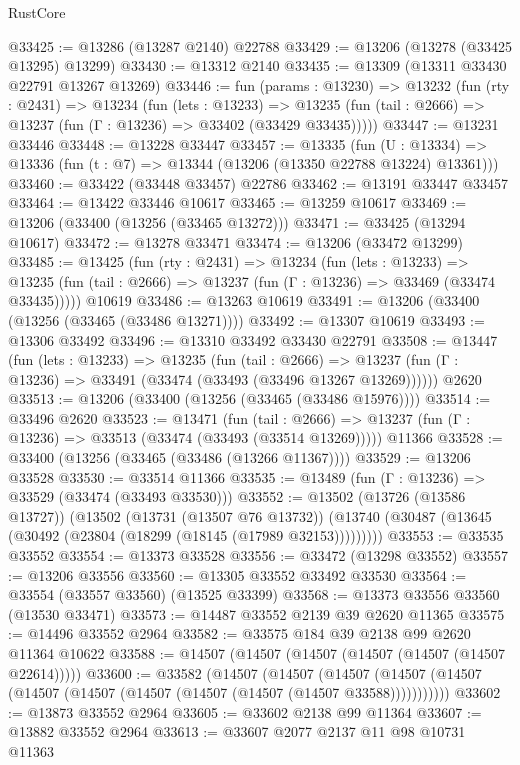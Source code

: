 \begin{lexlean}{RustCore}
\begin{coremodule}
@33425 := @13286 (@13287 @2140) @22788
@33429 := @13206 (@13278 (@33425 @13295) @13299)
@33430 := @13312 @2140
@33435 := @13309 (@13311 @33430 @22791 @13267 @13269)
@33446 := fun (params : @13230) =>
  @13232
    (fun (rty : @2431) =>
    @13234
      (fun (lets : @13233) =>
      @13235 (fun (tail : @2666) => @13237 (fun (Γ : @13236) => @33402 (@33429 @33435)))))
@33447 := @13231 @33446
@33448 := @13228 @33447
@33457 := @13335
    (fun (U : @13334) => @13336 (fun (t : @7) => @13344 (@13206 (@13350 @22788 @13224) @13361)))
@33460 := @33422 (@33448 @33457) @22786
@33462 := @13191 @33447 @33457
@33464 := @13422 @33446 @10617
@33465 := @13259 @10617
@33469 := @13206 (@33400 (@13256 (@33465 @13272)))
@33471 := @33425 (@13294 @10617)
@33472 := @13278 @33471
@33474 := @13206 (@33472 @13299)
@33485 := @13425
    (fun (rty : @2431) =>
    @13234
      (fun (lets : @13233) =>
      @13235 (fun (tail : @2666) => @13237 (fun (Γ : @13236) => @33469 (@33474 @33435)))))
    @10619
@33486 := @13263 @10619
@33491 := @13206 (@33400 (@13256 (@33465 (@33486 @13271))))
@33492 := @13307 @10619
@33493 := @13306 @33492
@33496 := @13310 @33492 @33430 @22791
@33508 := @13447
    (fun (lets : @13233) =>
    @13235
      (fun (tail : @2666) =>
      @13237 (fun (Γ : @13236) => @33491 (@33474 (@33493 (@33496 @13267 @13269))))))
    @2620
@33513 := @13206 (@33400 (@13256 (@33465 (@33486 @15976))))
@33514 := @33496 @2620
@33523 := @13471
    (fun (tail : @2666) => @13237 (fun (Γ : @13236) => @33513 (@33474 (@33493 (@33514 @13269)))))
    @11366
@33528 := @33400 (@13256 (@33465 (@33486 (@13266 @11367))))
@33529 := @13206 @33528
@33530 := @33514 @11366
@33535 := @13489 (fun (Γ : @13236) => @33529 (@33474 (@33493 @33530)))
@33552 := @13502
    (@13726 (@13586 @13727))
    (@13502
      (@13731 (@13507 @76 @13732))
      (@13740 (@30487 (@13645 (@30492 (@23804 (@18299 (@18145 (@17989 @32153)))))))))
@33553 := @33535 @33552
@33554 := @13373 @33528
@33556 := @33472 (@13298 @33552)
@33557 := @13206 @33556
@33560 := @13305 @33552 @33492 @33530
@33564 := @33554 (@33557 @33560) (@13525 @33399)
@33568 := @13373 @33556 @33560 (@13530 @33471)
@33573 := @14487 @33552 @2139 @39 @2620 @11365
@33575 := @14496 @33552 @2964
@33582 := @33575 @184 @39 @2138 @99 @2620 @11364 @10622
@33588 := @14507 (@14507 (@14507 (@14507 (@14507 (@14507 @22614)))))
@33600 := @33582
    (@14507
      (@14507
        (@14507 (@14507 (@14507 (@14507 (@14507 (@14507 (@14507 (@14507 (@14507 @33588)))))))))))
@33602 := @13873 @33552 @2964
@33605 := @33602 @2138 @99 @11364
@33607 := @13882 @33552 @2964
@33613 := @33607 @2077 @2137 @11 @98 @10731 @11363

\end{coremodule}
\end{lexlean}
